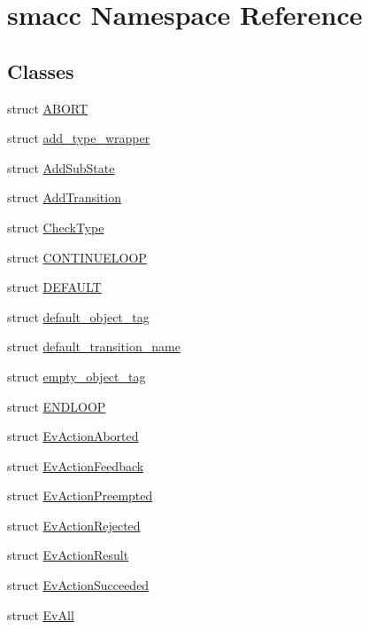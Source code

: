 \hypertarget{namespacesmacc}{}\section{smacc Namespace Reference}
\label{namespacesmacc}
\subsection*{Classes}
\begin{DoxyCompactItemize}
\item 
struct \hyperlink{structsmacc_1_1ABORT}{A\+B\+O\+RT}
\item 
struct \hyperlink{structsmacc_1_1add__type__wrapper}{add\+\_\+type\+\_\+wrapper}
\item 
struct \hyperlink{structsmacc_1_1AddSubState}{Add\+Sub\+State}
\item 
struct \hyperlink{structsmacc_1_1AddTransition}{Add\+Transition}
\item 
struct \hyperlink{structsmacc_1_1CheckType}{Check\+Type}
\item 
struct \hyperlink{structsmacc_1_1CONTINUELOOP}{C\+O\+N\+T\+I\+N\+U\+E\+L\+O\+OP}
\item 
struct \hyperlink{structsmacc_1_1DEFAULT}{D\+E\+F\+A\+U\+LT}
\item 
struct \hyperlink{structsmacc_1_1default__object__tag}{default\+\_\+object\+\_\+tag}
\item 
struct \hyperlink{structsmacc_1_1default__transition__name}{default\+\_\+transition\+\_\+name}
\item 
struct \hyperlink{structsmacc_1_1empty__object__tag}{empty\+\_\+object\+\_\+tag}
\item 
struct \hyperlink{structsmacc_1_1ENDLOOP}{E\+N\+D\+L\+O\+OP}
\item 
struct \hyperlink{structsmacc_1_1EvActionAborted}{Ev\+Action\+Aborted}
\item 
struct \hyperlink{structsmacc_1_1EvActionFeedback}{Ev\+Action\+Feedback}
\item 
struct \hyperlink{structsmacc_1_1EvActionPreempted}{Ev\+Action\+Preempted}
\item 
struct \hyperlink{structsmacc_1_1EvActionRejected}{Ev\+Action\+Rejected}
\item 
struct \hyperlink{structsmacc_1_1EvActionResult}{Ev\+Action\+Result}
\item 
struct \hyperlink{structsmacc_1_1EvActionSucceeded}{Ev\+Action\+Succeeded}
\item 
struct \hyperlink{structsmacc_1_1EvAll}{Ev\+All}

\end{DoxyCompactItemize}
